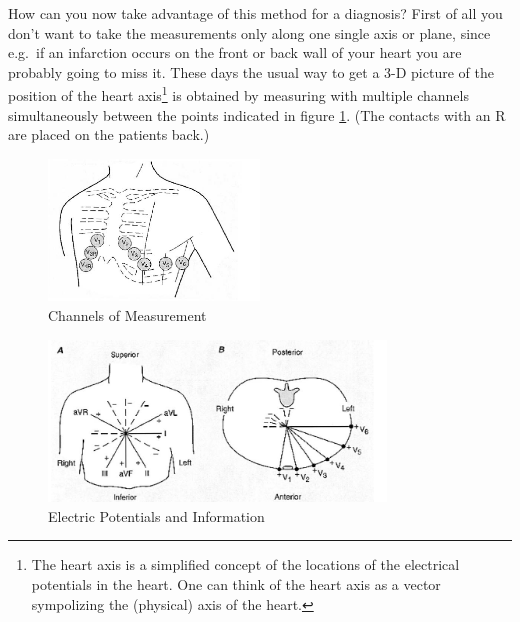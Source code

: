 How can you now take advantage of this method for a diagnosis? First of all you don't want to take the measurements only along one single axis or plane, since e.g.\ if an infarction occurs on the front or back wall of your heart you are probably going to miss it. These days the usual way to get a 3-D picture of the position of the heart axis\footnote{The heart axis is a simplified concept of the locations of the electrical potentials in the heart. One can think of the heart axis as a vector sympolizing the (physical) axis of the heart.} is obtained by measuring with multiple channels simultaneously between the points indicated in figure \ref{fig:channels}. (The contacts with an R are placed on the patients back.) \myskip

\begin{figure}[h]
    \begin{center}
        \includegraphics[width=0.5\textwidth]{./Exp1/pic/image7.png}
    \end{center}
    \caption{Channels of Measurement}
    \label{fig:channels}
\end{figure}

\begin{figure}[h]
    \begin{center}
        \includegraphics[width=0.8\textwidth]{./Exp1/pic/image8.png}
    \end{center}
    \caption{Electric Potentials and Information}
    \label{fig:heartcomp}
\end{figure}

